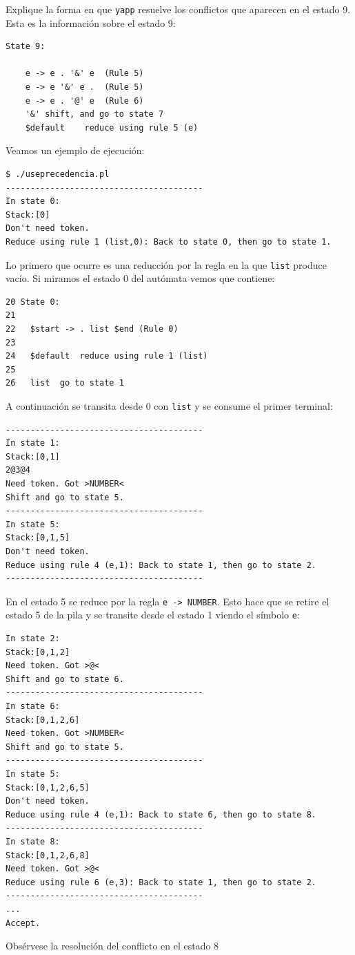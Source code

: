 \begin{exercise}
Explique la forma en que \verb|yapp| resuelve 
los conflictos que aparecen en el estado 9.
Esta es la información sobre el estado 9:

\begin{verbatim}
State 9:

	e -> e . '&' e	(Rule 5)
	e -> e '&' e .	(Rule 5)
	e -> e . '@' e	(Rule 6)
	'&'	shift, and go to state 7
	$default	reduce using rule 5 (e)
\end{verbatim}
\end{exercise}

Veamos un ejemplo de ejecución:

\begin{verbatim}
$ ./useprecedencia.pl
----------------------------------------
In state 0:
Stack:[0]
Don't need token.
Reduce using rule 1 (list,0): Back to state 0, then go to state 1.
\end{verbatim}
Lo primero que ocurre es una reducción por la regla 
en la que \verb|list| produce vacío. Si miramos el estado 0
del autómata vemos que contiene:
\begin{verbatim}
20 State 0:
21
22   $start -> . list $end (Rule 0)
23
24   $default  reduce using rule 1 (list)
25
26   list  go to state 1
\end{verbatim}
A continuación se transita desde 0 con \verb|list|
y se consume el primer terminal:
\begin{verbatim}
----------------------------------------
In state 1:
Stack:[0,1]
2@3@4
Need token. Got >NUMBER<
Shift and go to state 5.
----------------------------------------
In state 5:
Stack:[0,1,5]
Don't need token.
Reduce using rule 4 (e,1): Back to state 1, then go to state 2.
----------------------------------------
\end{verbatim}
En el estado 5 se reduce por la regla \verb|e -> NUMBER|.
Esto hace que se retire el estado 5 de la pila y se
transite desde el estado 1 viendo el símbolo \verb|e|:
\begin{verbatim}
In state 2:
Stack:[0,1,2]
Need token. Got >@<
Shift and go to state 6.
----------------------------------------
In state 6:
Stack:[0,1,2,6]
Need token. Got >NUMBER<
Shift and go to state 5.
----------------------------------------
In state 5:
Stack:[0,1,2,6,5]
Don't need token.
Reduce using rule 4 (e,1): Back to state 6, then go to state 8.
----------------------------------------
In state 8:
Stack:[0,1,2,6,8]
Need token. Got >@<
Reduce using rule 6 (e,3): Back to state 1, then go to state 2.
----------------------------------------
...
Accept.
\end{verbatim}
Obsérvese la resolución del conflicto en el estado 8

